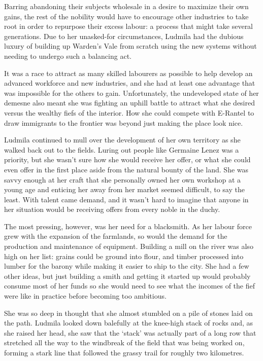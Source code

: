  

Barring abandoning their subjects wholesale in a desire to maximize their own gains, the rest of the nobility would have to encourage other industries to take root in order to repurpose their excess labour: a process that might take several generations. Due to her unasked-for circumstances, Ludmila had the dubious luxury of building up Warden’s Vale from scratch using the new systems without needing to undergo such a balancing act.

 

It was a race to attract as many skilled labourers as possible to help develop an advanced workforce and new industries, and she had at least one advantage that was impossible for the others to gain. Unfortunately, the undeveloped state of her demesne also meant she was fighting an uphill battle to attract what she desired versus the wealthy fiefs of the interior. How she could compete with E-Rantel to draw immigrants to the frontier was beyond just making the place look nice.

 

Ludmila continued to mull over the development of her own territory as she walked back out to the fields. Luring out people like Germaine Lenez was a priority, but she wasn’t sure how she would receive her offer, or what she could even offer in the first place aside from the natural bounty of the land. She was savvy enough at her craft that she personally owned her own workshop at a young age and enticing her away from her market seemed difficult, to say the least. With talent came demand, and it wasn’t hard to imagine that anyone in her situation would be receiving offers from every noble in the duchy.

 

The most pressing, however, was her need for a blacksmith. As her labour force grew with the expansion of the farmlands, so would the demand for the production and maintenance of equipment. Building a mill on the river was also high on her list: grains could be ground into flour, and timber processed into lumber for the barony while making it easier to ship to the city. She had a few other ideas, but just building a smith and getting it started up would probably consume most of her funds so she would need to see what the incomes of the fief were like in practice before becoming too ambitious.

 

She was so deep in thought that she almost stumbled on a pile of stones laid on the path. Ludmila looked down balefully at the knee-high stack of rocks and, as she raised her head, she saw that the ‘stack’ was actually part of a long row that stretched all the way to the windbreak of the field that was being worked on, forming a stark line that followed the grassy trail for roughly two kilometres.

